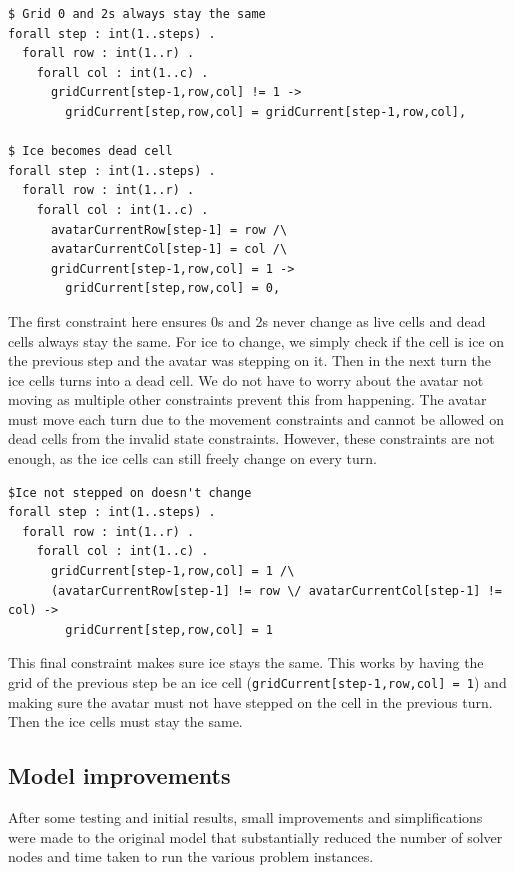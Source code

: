 \documentclass{article}
\begin{document}
\begin{lstlisting}[caption={Constraints for grid cells}, captionpos=b]
$ Grid 0 and 2s always stay the same
forall step : int(1..steps) .
  forall row : int(1..r) .
    forall col : int(1..c) .
      gridCurrent[step-1,row,col] != 1 ->
        gridCurrent[step,row,col] = gridCurrent[step-1,row,col],

$ Ice becomes dead cell
forall step : int(1..steps) .
  forall row : int(1..r) .
    forall col : int(1..c) .
      avatarCurrentRow[step-1] = row /\
	  avatarCurrentCol[step-1] = col /\
	  gridCurrent[step-1,row,col] = 1 ->
	    gridCurrent[step,row,col] = 0,
\end{lstlisting}
The first constraint here ensures 0s and 2s never change as live cells and dead cells always stay the same. For ice to change, we simply check if the cell is ice on the previous step and the avatar was stepping on it. Then in the next turn the ice cells turns into a dead cell. We do not have to worry about the avatar not moving as multiple other constraints prevent this from happening. The avatar must move each turn due to the movement constraints and cannot be allowed on dead cells from the invalid state constraints. However, these constraints are not enough, as the ice cells can still freely change on every turn. 
\begin{lstlisting}[caption={Additional constraint to prevent ice cells from changing}, captionpos=b]
$Ice not stepped on doesn't change
forall step : int(1..steps) .
  forall row : int(1..r) .
    forall col : int(1..c) .
	  gridCurrent[step-1,row,col] = 1 /\
	  (avatarCurrentRow[step-1] != row \/ avatarCurrentCol[step-1] != col) ->
	    gridCurrent[step,row,col] = 1

\end{lstlisting}
This final constraint makes sure ice stays the same. This works by having the grid of the previous step be an ice cell (\texttt{gridCurrent[step-1,row,col] = 1}) and making sure the avatar must not have stepped on the cell in the previous turn. Then the ice cells must stay the same.
\subsection{Model improvements}
After some testing and initial results, small improvements and simplifications were made to the original model that substantially reduced the number of solver nodes and time taken to run the various problem instances. 
\end{document}
